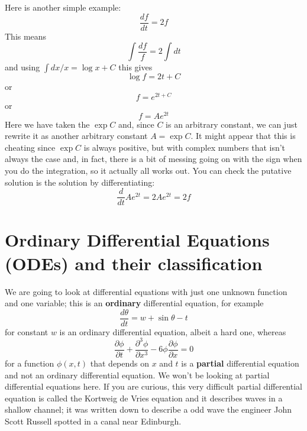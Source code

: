 \documentclass[12pt]{article}
\begin{document}
Here is another simple example:
\begin{equation}
  \frac{df}{dt}=2f
\end{equation}
This means
\begin{equation}
  \int\frac{df}{f}=2\int{}dt
\end{equation}
and using $\int dx/x=\log{x}+C$ this gives
\begin{equation}
  \log{f}=2t+C
\end{equation}
or
\begin{equation}
  f=e^{2t+C}
\end{equation}
or
\begin{equation}
  f=Ae^{2t}
\end{equation}
Here we have taken the $\exp{C}$ and, since $C$ is an arbitrary
constant, we can just rewrite it as another arbitrary constant
$A=\exp{C}$. It might appear that this is cheating since $\exp{C}$ is
always positive, but with complex numbers that isn't always the case
and, in fact, there is a bit of messing going on with the sign when
you do the integration, so it actually all works out. You can check the putative solution is the solution by differentiating:
\begin{equation}
  \frac{d}{dt}Ae^{2t}=2Ae^{2t}=2f
\end{equation}

\section*{Ordinary Differential Equations (ODEs) and their classification}
We are going to look at differential equations with just one unknown function and one variable; this is an \textbf{ordinary} differential equation, for example
\begin{equation}
  \frac{d\theta}{dt}=w+\sin{\theta-t}
\end{equation}
for constant $w$ is an ordinary differential equation, albeit a hard one, whereas
\begin{equation}
  \frac{\partial \phi}{\partial t}+\frac{\partial^3\phi}{\partial x^3}-6\phi\frac{\partial \phi}{\partial x}=0
\end{equation}
for a function $\phi(x,t)$ that depends on $x$ and $t$ is a
\textbf{partial} differential equation and not an ordinary
differential equation. We won't be looking at partial differential
equations here. If you are curious, this very difficult partial
differential equation is called the Kortweig de Vries equation and it
describes waves in a shallow channel; it was written down to describe
a odd wave the engineer John Scott Russell spotted in a canal near
Edinburgh.
\end{document}
